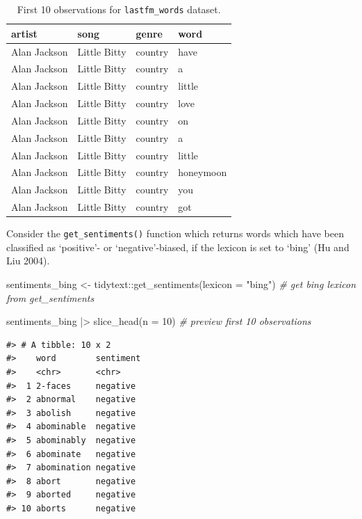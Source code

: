\documentclass[
  letterpaper,
]{latex/krantz}
\newenvironment{Shaded}{\begin{snugshade}}{\end{snugshade}}
\newcommand{\AttributeTok}[1]{\textcolor[rgb]{0.00,0.00,0.00}{#1}}
\newcommand{\CommentTok}[1]{\textcolor[rgb]{0.00,0.00,0.00}{\textit{#1}}}
\newcommand{\DecValTok}[1]{\textcolor[rgb]{0.00,0.00,0.00}{#1}}
\newcommand{\FunctionTok}[1]{\textcolor[rgb]{0.00,0.00,0.00}{#1}}
\newcommand{\NormalTok}[1]{\textcolor[rgb]{0.00,0.00,0.00}{#1}}
\newcommand{\OtherTok}[1]{\textcolor[rgb]{0.00,0.00,0.00}{#1}}
\newcommand{\SpecialCharTok}[1]{\textcolor[rgb]{0.00,0.00,0.00}{#1}}
\newcommand{\StringTok}[1]{\textcolor[rgb]{0.00,0.00,0.00}{#1}}
\begin{document}
\hypertarget{tbl-td-lastfm-tokens}{}
\begin{table}
\caption{\label{tbl-td-lastfm-tokens}First 10 observations for \texttt{lastfm\_words} dataset. }\tabularnewline

\centering
\begin{tabular}{llll}
\toprule
artist & song & genre & word\\
\midrule
Alan Jackson & Little Bitty & country & have\\
Alan Jackson & Little Bitty & country & a\\
Alan Jackson & Little Bitty & country & little\\
Alan Jackson & Little Bitty & country & love\\
Alan Jackson & Little Bitty & country & on\\
\addlinespace
Alan Jackson & Little Bitty & country & a\\
Alan Jackson & Little Bitty & country & little\\
Alan Jackson & Little Bitty & country & honeymoon\\
Alan Jackson & Little Bitty & country & you\\
Alan Jackson & Little Bitty & country & got\\
\bottomrule
\end{tabular}
\end{table}

Consider the \texttt{get\_sentiments()} function which returns words
which have been classified as `positive'- or `negative'-biased, if the
lexicon is set to `bing' (Hu and Liu 2004).

\begin{Shaded}
\begin{Highlighting}[]
\NormalTok{sentiments\_bing }\OtherTok{\textless{}{-}} 
\NormalTok{  tidytext}\SpecialCharTok{::}\FunctionTok{get\_sentiments}\NormalTok{(}\AttributeTok{lexicon =} \StringTok{"bing"}\NormalTok{) }\CommentTok{\# get \textquotesingle{}bing\textquotesingle{} lexicon from get\_sentiments}

\NormalTok{sentiments\_bing }\SpecialCharTok{|\textgreater{}} 
  \FunctionTok{slice\_head}\NormalTok{(}\AttributeTok{n =} \DecValTok{10}\NormalTok{) }\CommentTok{\# preview first 10 observations}
\end{Highlighting}
\end{Shaded}

\begin{verbatim}
#> # A tibble: 10 x 2
#>    word        sentiment
#>    <chr>       <chr>    
#>  1 2-faces     negative 
#>  2 abnormal    negative 
#>  3 abolish     negative 
#>  4 abominable  negative 
#>  5 abominably  negative 
#>  6 abominate   negative 
#>  7 abomination negative 
#>  8 abort       negative 
#>  9 aborted     negative 
#> 10 aborts      negative
\end{verbatim}
\end{document}
